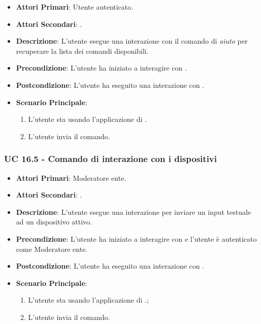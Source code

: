 	\begin{itemize}
		\item \textbf{Attori Primari}: Utente autenticato.
		\item \textbf{Attori Secondari}: .
		\item \textbf{Descrizione}: L'utente esegue una interazione con il comando di \textit{aiuto} per recuperare la lista dei comandi disponibili.
		\item \textbf{Precondizione}: L'utente ha iniziato a interagire con .
		\item \textbf{Postcondizione}: L'utente ha eseguito una interazione con .
		\item \textbf{Scenario Principale}:
		\begin{enumerate}
			\item L'utente sta usando l'applicazione di . 
			\item L'utente invia il comando.
		\end{enumerate}
	\end{itemize}


	\subsubsection{UC 16.5 - Comando di interazione con i dispositivi}

	\begin{itemize}
		\item \textbf{Attori Primari}: Moderatore ente.
		\item \textbf{Attori Secondari}: .
		\item \textbf{Descrizione}: L'utente esegue una interazione per inviare un input testuale ad un dispositivo attivo. 
		\item \textbf{Precondizione}: L'utente ha iniziato a interagire con  e l'utente è autenticato come Moderatore ente.
		\item \textbf{Postcondizione}: L'utente ha eseguito una interazione con .
		\item \textbf{Scenario Principale}:
		\begin{enumerate}
			\item L'utente sta usando l'applicazione di .;
			\item L'utente invia il comando.
		\end{enumerate}
	\end{itemize}

